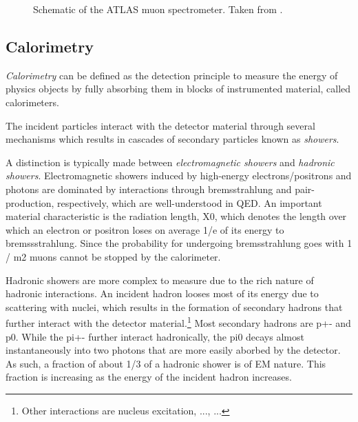 

\begin{figure}
    \caption{Schematic of the ATLAS muon spectrometer. Taken from .}
    \label{fig:ATLASmuonspectrometer}
\end{figure}


\subsection{Calorimetry}
\emph{Calorimetry} can be defined as the detection principle to measure the energy of physics objects by fully absorbing them in blocks of instrumented material, called calorimeters.

The incident particles interact with the detector material through several mechanisms which results in cascades of secondary particles known as \emph{showers}. 

A distinction is typically made between \emph{electromagnetic showers} and \emph{hadronic showers}.
Electromagnetic showers induced by high-energy electrons/positrons and photons are dominated by interactions through bremsstrahlung and pair-production, respectively, which are well-understood in QED.
An important material characteristic is the radiation length, X0, which denotes the length over which an electron or positron loses on average 1/e of its energy to bremssstrahlung. Since the probability for undergoing bremsstrahlung goes with 1 / m2 muons cannot be stopped by the calorimeter.

Hadronic showers are more complex to measure due to the rich nature of hadronic interactions. An incident hadron looses most of its energy due to scattering with nuclei, which results in the formation of secondary hadrons that further interact with the detector material.\footnote{Other interactions are nucleus excitation, ..., ...} Most secondary hadrons are p+- and p0. While the pi+- further interact hadronically, the pi0 decays almost instantaneously into two photons that are more easily aborbed by the detector. As such, a fraction of about 1/3 of a hadronic shower is of EM nature. This fraction is increasing as the energy of the incident hadron increases.


